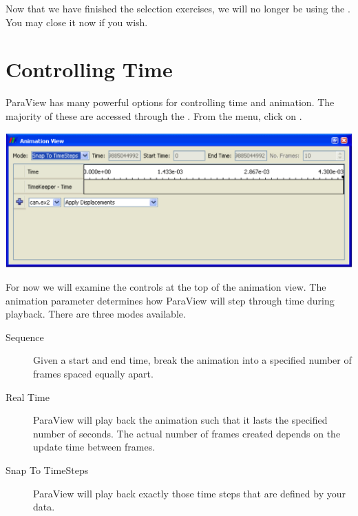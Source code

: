 Now that we have finished the selection exercises, we will no longer be
using the .  You may close it now if you wish.


\section{Controlling Time}


ParaView has many powerful options for controlling time and animation.  The
majority of these are accessed through the .  From
the menu, click on  \ra {}.

\begin{inlinefig}
  \includegraphics[width=\scw]{images/AnimationView}
\end{inlinefig}

For now we will examine the controls at the top of the animation view.  The
animation  parameter determines how ParaView will step
through time during playback.  There are three modes available.

\begin{description}
\item[Sequence] Given a start and end time, break the animation into a
  specified number of frames spaced equally apart.
\item[Real Time] ParaView will play back the animation such that it lasts
  the specified number of seconds.  The actual number of frames created
  depends on the update time between frames.
\item[Snap To TimeSteps] ParaView will play back exactly those time steps
  that are defined by your data.
\end{description}

